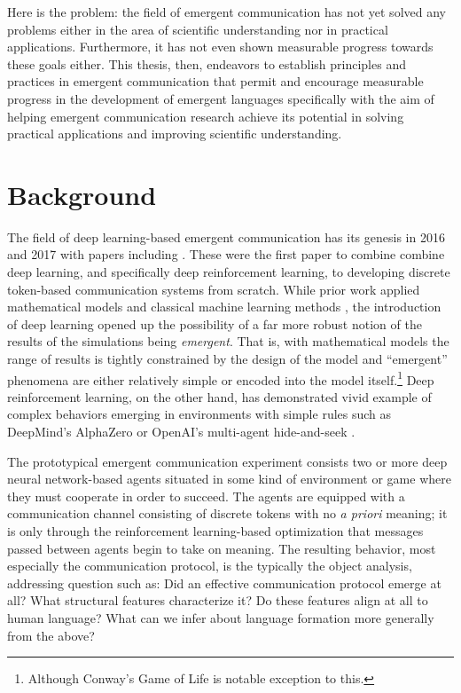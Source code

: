 Here is the problem: the field of emergent communication has not yet solved any problems either in the area of scientific understanding nor in practical applications.
Furthermore, it has not even shown measurable progress towards these goals either.
This thesis, then, endeavors to establish principles and practices in emergent communication that permit and encourage measurable progress in the development of emergent languages specifically with the aim of helping emergent communication research achieve its potential in solving practical applications and improving scientific understanding.

\section{Background}

The field of deep learning-based emergent communication has its genesis in 2016 and 2017 with papers including .
These were the first paper to combine combine deep learning, and specifically deep reinforcement learning, to developing discrete token-based communication systems from scratch.
While prior work applied mathematical models  and classical machine learning methods , the introduction of deep learning opened up the possibility of a far more robust notion of the results of the simulations being \emph{emergent}.
That is, with mathematical models the range of results is tightly constrained by the design of the model and ``emergent'' phenomena are either relatively simple or encoded into the model itself.\footnote{Although Conway's Game of Life is notable exception to this.}
Deep reinforcement learning, on the other hand, has demonstrated vivid example of complex behaviors emerging in environments with simple rules such as DeepMind's AlphaZero  or OpenAI's multi-agent hide-and-seek .

The prototypical emergent communication experiment consists two or more deep neural network-based agents situated in some kind of environment or game where they must cooperate in order to succeed.
The agents are equipped with a communication channel consisting of discrete tokens with no \emph{a priori} meaning; it is only through the reinforcement learning-based optimization that messages passed between agents begin to take on meaning.
The resulting behavior, most especially the communication protocol, is the typically the object analysis, addressing question such as:
  Did an effective communication protocol emerge at all?
  What structural features characterize it?
  Do these features align at all to human language?
  What can we infer about language formation more generally from the above?

